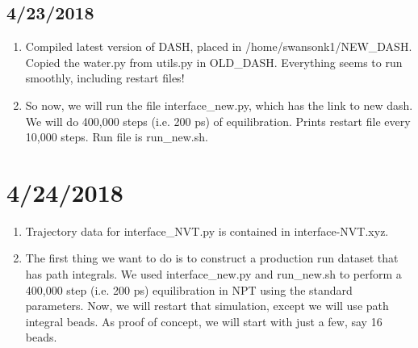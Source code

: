 \documentclass[12pt,reqno]{amsart}
\numberwithin{equation}{section}
\begin{document}
\subsection{4/23/2018}

\begin{enumerate}
\item Compiled latest version of DASH, placed in /home/swansonk1/NEW\_DASH.  Copied the water.py from utils.py in OLD\_DASH.  Everything seems to run smoothly, including restart files!  
\item So now, we will run the file interface\_new.py, which has the link to new dash.  We will do 400,000 steps (i.e. 200 ps) of equilibration.  Prints restart file every 10,000 steps.  Run file is run\_new.sh.    
\end{enumerate}

\section{4/24/2018}

\begin{enumerate}
\item Trajectory data for interface\_NVT.py is contained in interface-NVT.xyz.  
\item The first thing we want to do is to construct a production run dataset that has path integrals.  We used interface\_new.py and run\_new.sh to perform a 400,000 step (i.e. 200 ps) equilibration in NPT using the standard parameters.  Now, we will restart that simulation, except we will use path integral beads.  As proof of concept, we will start with just a few, say 16 beads.  
\end{enumerate}
\end{document}
